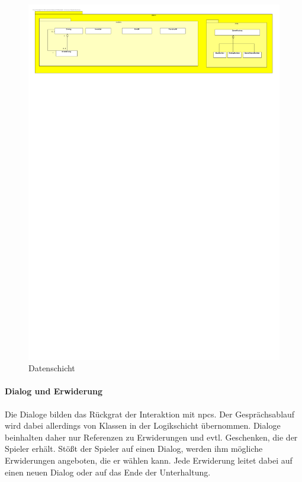 \begin{figure}[h]
	\begin{center}
		\includegraphics[trim=0cm 45cm 0cm 0cm, clip=true, width=16cm]{kapitel/bausteinsicht/daten.pdf}
	\end{center}
	\caption{Datenschicht}
	\label{fig:daten_uml}
\end{figure}

\paragraph{Dialog und Erwiderung}
Die Dialoge bilden das Rückgrat der Interaktion mit \gls{npcs}. Der Gesprächsablauf wird dabei
allerdings von Klassen in der Logikschicht übernommen. Dialoge beinhalten daher nur Referenzen zu
Erwiderungen und evtl. Geschenken, die der \gls{Spieler} erhält. Stößt der \gls{Spieler} auf einen 
\gls{Dialog}, werden ihm mögliche Erwiderungen angeboten, die er 
wählen kann. Jede Erwiderung leitet dabei auf einen neuen \gls{Dialog} oder auf das Ende der 
Unterhaltung.


